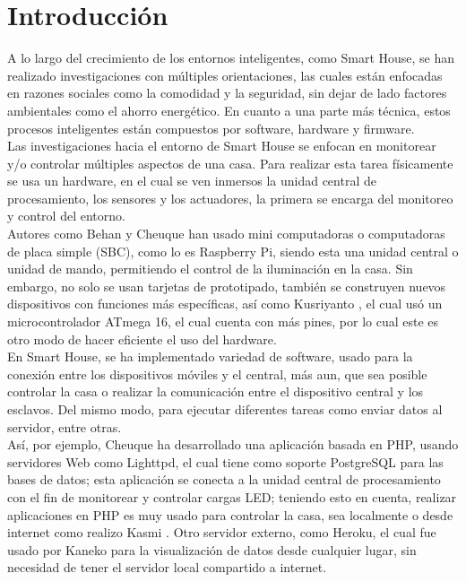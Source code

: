 \chapter{Introducción}

 A lo largo del crecimiento de los entornos inteligentes, como Smart House, se han realizado investigaciones con múltiples orientaciones, las cuales están enfocadas en razones sociales como la comodidad y la seguridad, sin dejar de lado factores ambientales como el ahorro energético. En cuanto a una parte más técnica, estos procesos inteligentes están compuestos por software, hardware y firmware.\\
 
 Las investigaciones hacia el entorno de Smart House se enfocan en monitorear y/o controlar múltiples aspectos de una casa. Para realizar esta tarea físicamente se usa un hardware, en el cual se ven inmersos la unidad central de procesamiento, los sensores y los actuadores, la primera se encarga del monitoreo y control del entorno.\\
 
 Autores como Behan \cite{Behan2013} y Cheuque \cite{Cheuque2015} han usado mini computadoras o computadoras de placa simple (SBC), como lo es Raspberry Pi, siendo esta una unidad central o unidad de mando, permitiendo el control de la iluminación en la casa. Sin embargo, no solo se usan tarjetas de prototipado, también se construyen nuevos dispositivos con funciones más específicas, así como Kusriyanto \cite{Kusriyanto2015}, el cual usó un microcontrolador ATmega 16, el cual cuenta con más pines, por lo cual este es otro modo de hacer eficiente el uso del hardware.\\
 
 En Smart House, se ha implementado variedad de software, usado para la conexión entre los dispositivos móviles y el central, más aun, que sea posible controlar la casa o realizar la comunicación entre el dispositivo central y los esclavos. Del mismo modo, para ejecutar diferentes tareas como enviar datos al servidor, entre otras.\\
 
 Así, por ejemplo, Cheuque \cite{Cheuque2015} ha desarrollado una aplicación basada en PHP, usando servidores Web como Lighttpd, el cual tiene como soporte PostgreSQL para las bases de datos; esta aplicación se conecta a la unidad central de procesamiento con el fin de monitorear y controlar cargas LED; teniendo esto en cuenta, realizar aplicaciones en PHP es muy usado para controlar la casa, sea localmente o desde internet como realizo Kasmi \cite{Kasmi2016}. Otro servidor externo, como Heroku, el cual fue usado por Kaneko \cite{Kaneko2017} para la visualización de datos desde cualquier lugar, sin necesidad de tener el servidor local compartido a internet.\\
 
